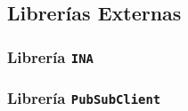 \subsection{Librerías Externas}
\subsubsection{Librería \texttt{INA}}


\subsubsection{Librería \texttt{PubSubClient}}



